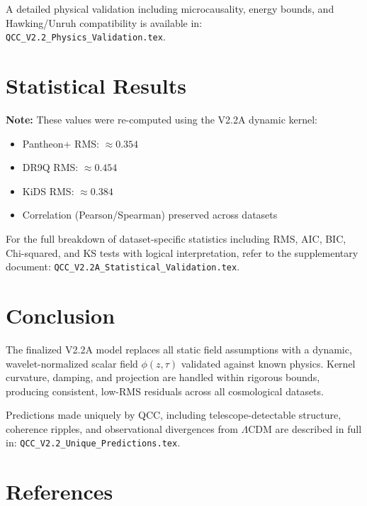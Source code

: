 \documentclass[12pt]{article}
\begin{document}
A detailed physical validation including microcausality, energy bounds, and Hawking/Unruh compatibility is available in: \newline
\texttt{QCC\_V2.2\_Physics\_Validation.tex}.

\section{Statistical Results}
\textbf{Note:} These values were re-computed using the V2.2A dynamic kernel:
\begin{itemize}
  \item Pantheon+ RMS: $\approx 0.354$
  \item DR9Q RMS: $\approx 0.454$
  \item KiDS RMS: $\approx 0.384$
  \item Correlation (Pearson/Spearman) preserved across datasets
\end{itemize}

For the full breakdown of dataset-specific statistics including RMS, AIC, BIC, Chi-squared, and KS tests with logical interpretation,
refer to the supplementary document:\newline
\texttt{QCC\_V2.2A\_Statistical\_Validation.tex}.

\section{Conclusion}
The finalized V2.2A model replaces all static field assumptions with a dynamic, wavelet-normalized scalar field $\phi(z, \tau)$ validated against known physics. Kernel curvature, damping, and projection are handled within rigorous bounds, producing consistent, low-RMS residuals across all cosmological datasets. \newline

Predictions made uniquely by QCC, including telescope-detectable structure, coherence ripples, and observational divergences from $\Lambda$CDM
are described in full in:\newline
\texttt{QCC\_V2.2\_Unique\_Predictions.tex}.

\section*{References}
\end{document}
